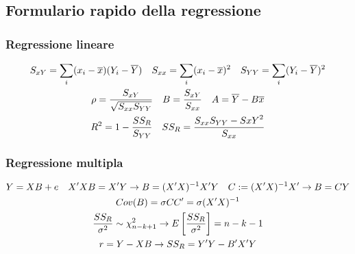 \documentclass[11pt]{article}
\begin{document}
\subsection{Formulario rapido della regressione}
\subsubsection{Regressione lineare}
\begin{gather*}
    S_{xY}=\sum_i (x_i-\overline{x})(Y_i-\overline{Y})\hspace{10px}S_{xx}=\sum_i(x_i-\overline{x})^2\hspace{10px}S_{YY}=\sum_i (Y_i-\overline{Y})^2\\ 
    \rho = \frac{S_{xY}}{\sqrt{S_{xx}S_{YY}}}\hspace{10px}B=\frac{S_{xY}}{S_{xx}}\hspace{10px}A=\overline{Y}-B\overline{x}\\ 
    R^2=1-\frac{SS_R}{S_{YY}}\hspace{10px}SS_R=\frac{S_{xx}S_{YY}-S{xY}^2}{S_{xx}}
\end{gather*}
\subsubsection{Regressione multipla}
\begin{gather*}
    Y=XB+e\hspace{10px}X'XB=X'Y \rightarrow B=(X'X)^{-1}X'Y\hspace{10px}C:=(X'X)^{-1}X'\rightarrow B=CY\\ 
    Cov(B)=\sigma C C' = \sigma (X'X)^{-1}\\ 
    \frac{SS_R}{\sigma^2}\sim \chi_{n-k+1}^2\rightarrow E\left[\frac{SS_R}{\sigma^2}\right]=n-k-1\\ 
    r=Y-XB\rightarrow SS_R=Y'Y-B'X'Y
\end{gather*}
\end{document}
